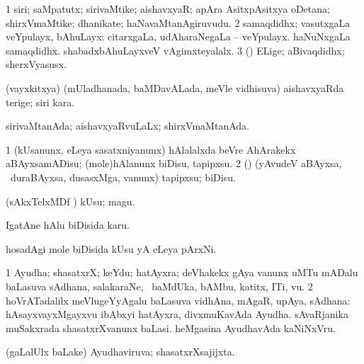 \bentry
{} 
\gl{\nA}
\expl{}
\bmng
\bnum
\num{1} siri; saMpatutx; sirivaMtike; aishavxyaR; apAra AsitxpAsitxya oDetana; shirxVmaMtike; dhanikate; haNavaMtanAgiruvudu. 
\num{2} samaqdidhx; vasutxgaLa veYpulayx, bAhuLayx:  citarxgaLa, udAharaNegaLa -- veYpulayx.  haNuNxgaLa samaqdidhx.  shabadxbAhuLayxveV vAgimxteyalalx. 
\num{3} (\pArxparx) ELige; aBivaqdidhx; sherxVyasusx. 
\enum
\emng
\eentry

\bentry
{} 
\gl{\nA}
\expl{}
\bmng
(vayxkitxya) (mUladhanada, baMDavALada, meVle vidhisuva) aishavxyaRda terige; siri kara. 
\emng
\eentry

\bentry
{} 
\gl{\gu}
\bmng
sirivaMtanAda; aishavxyaRvuLaLx; shirxVmaMtanAda. 
\emng
\eentry

\bentry
{} 
\gl{\sakirx}
\expl{}
\bmng
\bnum
\num{1} (kUsanunx, eLeya sasatxniyanunx) hAlalalxda beVre AhArakekx aBAyxsamADisu; (mole)hAlanunx biDisu, tapipxsu. 
\num{2} (\rUpa) (yAvudeV aBAyxsa, \kanmu\ duraBAyxsa, dusasxMga, \mo vanunx) tapipxsu; biDisu. 
\enum
\emng
\eentry

\bentry
{} 
\gl{\nA}
\expl{}
\bmng
(sAkxTelxMDf \parx) kUsu; magu. 
\emng
\eentry

\bentry
{} 
\gl{\nA}
\expl{}
\bmng
IgatAne hAlu biDisida karu. 
\emng
\eentry

\bentry
{} 
\gl{\nA}
\expl{}
\bmng
hosadAgi mole biDisida kUsu yA eLeya pArxNi. 
\emng
\eentry

\bentry
{} 
\gl{\nA}
\expl{}
\bmng
\bnum
\num{1} Ayudha; shasatxrX; keYdu; hatAyxra; deVhakekx gAya \mo vanunx uMTu mADalu baLasuva sAdhana, salakaraNe, \udA\ baMdUka, bAMbu, katitx, ITi, \mo vu. 
\num{2} hoVrATadalilx meVlugeYyAgalu baLasuva vidhAna, mAgaR, upAya, sAdhana:  hAsayxvayxMgayxvu ibAbxyi hatAyxra, divxmuKavAda Ayudha.  sAvaRjanika muSakxrada shasatxrXvanunx baLasi.  heMgasina AyudhavAda kaNiNxVru. 
\enum
\emng
\eentry

\bentry
{} 
\gl{\gu}
\expl{}
\bmng
(\saMpa gaLalUlx baLake) Ayudhaviruva; shasatxrXsajijxta. 
\emng
\eentry

